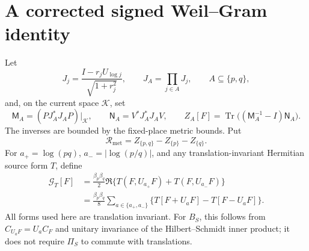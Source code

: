 \documentclass[11pt]{article}
\theoremstyle{remark}
\newcommand{\KK}{\mathcal K}
\newcommand{\Gform}{\mathcal G}
\newcommand{\Rmet}{\mathcal R_{\mathrm{met}}}
\DeclareMathOperator{\Tr}{Tr}
\numberwithin{equation}{section}
\begin{document}
\section{A corrected signed Weil--Gram identity}\label{sec:gram}

Let
\[
 J_j=\frac{I-r_jU_{\log j}}{\sqrt{1+r_j^2}},\qquad
 J_A=\prod_{j\in A}J_j,\qquad A\subseteq\{p,q\},
\]
and, on the current space \(\KK\), set
\[
 \mathsf M_A=(PJ_A^*J_AP)|_\KK,\qquad
 \mathsf N_A=V^*J_A^*J_AV,\qquad
 Z_A[F]=\Tr\bigl((\mathsf M_A^{-1}-I)\mathsf N_A\bigr).
\]
The inverses are bounded by the fixed-place metric bounds. Put
\begin{equation}\label{eq:Rmet}
 \Rmet=Z_{\{p,q\}}-Z_{\{p\}}-Z_{\{q\}}.
\end{equation}
For \(a_+=\log(pq)\), \(a_-=|\log(p/q)|\), and any translation-invariant
Hermitian source form \(T\), define
\begin{align}
 \Gform_T[F]
 &=\frac{\beta_p\beta_q}{2}
      \Re\{T(F,U_{a_+}F)+T(F,U_{a_-}F)\} \label{eq:G}\\
 &=\frac{\beta_p\beta_q}{8}
       \sum_{a\in\{a_+,a_-\}}\{T[F+U_aF]-T[F-U_aF]\}.
 \nonumber
\end{align}
All forms used here are translation invariant. For \(B_S\), this follows
from \(C_{U_aF}=U_aC_F\) and unitary invariance of the Hilbert--Schmidt
inner product; it does not require \(\Pi_S\) to commute with translations.
\end{document}
